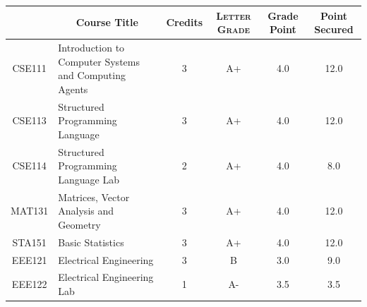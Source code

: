 \documentclass[11pt]{article}
\newcommand*{\numtwo}[1]{\pgfmathprintnumber[
                    fixed, precision=2, fixed zerofill=true]{#1}}
\begin{document}
                \begin{center}
                    \renewcommand{\arraystretch}{1.08}
                    
                \begin{tabular}{|c|l|c|>{\scshape}c|c|c|}
                \hline  \rule[-1ex]{0pt}{3.5ex} {\centering{\bf Course Code}} &  \multicolumn{1}{c|}{\textbf{Course Title}}  & {\bf Credits} & {\bf Letter Grade} & {\bf Grade Point} & {\bf Point Secured}  \\ 
                \hline   CSE111 &  Introduction to Computer Systems and Computing Agents		 & 3 & A+ & 4.0 & 12.0 \\ %
                \hline   CSE113 &  Structured Programming Language		 & 3 & A+ & 4.0 & 12.0 \\ %
                \hline   CSE114 &  Structured Programming Language Lab		 & 2 & A+ & 4.0 & 8.0 \\ %
                \hline   MAT131 &  Matrices, Vector Analysis and Geometry		 & 3 & A+ & 4.0 & 12.0 \\ %
                \hline   STA151 &  Basic Statistics		 & 3 & A+ & 4.0 & 12.0 \\ %
                \hline   EEE121 &  Electrical Engineering		 & 3 & B & 3.0 & 9.0 \\ %
                \hline   EEE122 &  Electrical Engineering Lab		 & 1 & A- & 3.5 & 3.5 \\ %

\hline                %
                \end{tabular}
                \end{center}
                \renewcommand{\arraystretch}{1.03}
\end{document}
